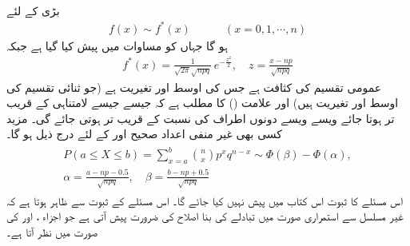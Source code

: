 \quad {}\\
بڑی  کے لئے
\begin{align*}
f(x)\sim f^*(x)\quad\quad\quad (x=0,1,\cdots,n)
\end{align*}
ہو گا جہاں  کو مساوات  میں پیش کیا گیا ہے جبکہ
\begin{align}\label{مساوات_شماریات_ڈی_موے_الف}
f^*(x)=\frac{1}{\sqrt{2\pi}\sqrt{npq}}\,e^{-\frac{z^2}{2}},\quad z=\frac{x-np}{\sqrt{npq}}
\end{align}
عمومی تقسیم کی کثافت ہے جس کی اوسط  اور تغیریت  ہے (جو ثنائی تقسیم کی اوسط اور تغیریت ہیں) اور علامت  () کا مطلب ہے کہ جیسے جیسے  لامتناہی کے قریب تر ہوتا جائے  ویسے ویسے دونوں اطراف کی نسبت  کے قریب تر ہوتی جائے گی۔ مزید کسی بھی غیر منفی اعداد صحیح  اور  کے لئے درج ذیل ہو گا۔
\begin{gather}
\begin{aligned}\label{مساوات_شماریات_ڈی_موے_ب}
P(a\le X\le b)=\sum_{x=a}^{b}\binom{n}{x}p^xq^{n-x}\sim \Phi(\beta)-\Phi(\alpha),\\
\alpha=\frac{a-np-0.5}{\sqrt{npq}},\quad \beta=\frac{b-np+0.5}{\sqrt{npq}}
\end{aligned}
\end{gather}
اس مسئلے کا ثبوت اس کتاب میں پیش نہیں کیا جائے گا۔ اس مسئلے کے ثبوت  سے ظاہر ہوتا ہے کہ غیر مسلسل سے استمراری صورت میں تبادلے کی بنا اصلاح کی ضرورت پیش آتی ہے جو اجزاء ،  اور  کی صورت میں نظر آتا ہے۔

